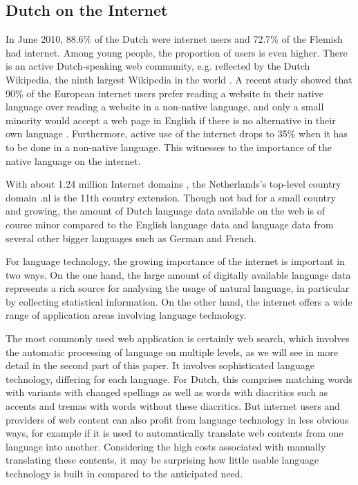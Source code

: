 \documentclass[]{../../metanetpaper}
\begin{document}
\begin{multicols}{2}
\subsection{Dutch on the Internet}

  In June 2010, 88.6\% of the Dutch \cite{Internetworldstats} were internet users and 72.7\% of the Flemish  \cite{VRIND} had internet. Among young people, the proportion of users is even higher. There is an active Dutch-speaking web community, e.g. reflected by the Dutch Wikipedia, the ninth largest Wikipedia in the world \cite{Wikipedia}.  A recent study showed that 90\% of the European internet users prefer reading a website in their native language over reading a website in a non-native language, and only a small minority would accept a web page in English if there is no alternative in their own language \cite{Flash}. Furthermore, active use of the internet drops to 35\% when it has to be done in a non-native language. This witnesses to the importance of the native language on the internet.


    With about 1.24 million Internet domains \cite{Webstats}, the Netherlands's top-level country domain .nl is the 11th country extension. Though not bad for a small country and growing, the amount of Dutch language data available on the web is of course minor compared to the English language data and language data from several other bigger languages such as German and French.

    For language technology, the growing importance of the internet is important in two ways. On the one hand, the large amount of digitally available language data represents a rich source for analysing the usage of natural language, in particular by collecting statistical information. On the other hand, the internet offers a wide range of application areas involving language technology.


    The most commonly used web application is certainly web search, which involves the automatic processing of language on multiple levels, as we will see in more detail in the second part of this paper. It involves sophisticated language technology, differing for each language. For Dutch, this comprises matching words with variants with changed spellings as well as words with diacritics such as accents and tremas with words without these diacritics. But internet users and providers of web content can also profit from language technology in less obvious ways, for example if it is used to automatically translate web contents from one language into another. Considering the high costs associated with manually translating these contents, it may be surprising how little usable language technology is built in compared to the anticipated need.


\end{multicols}
\end{document}
